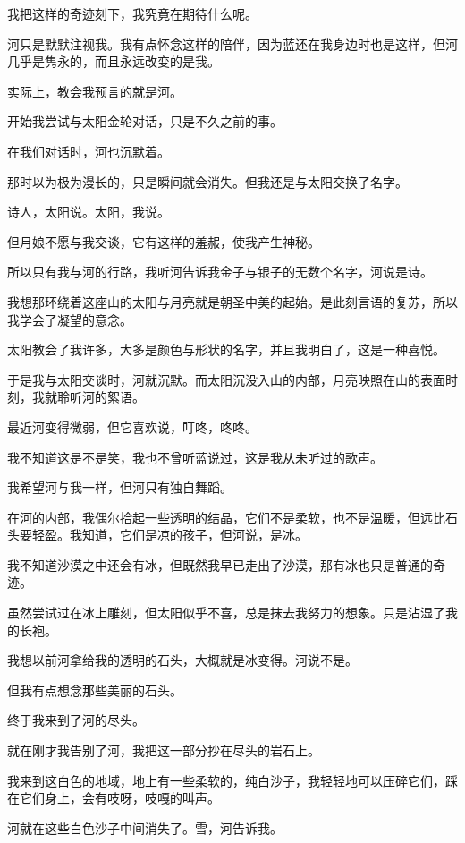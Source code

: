 \documentclass[UTF8]{article}
\begin{document}
\par 我把这样的奇迹刻下，我究竟在期待什么呢。
\par 河只是默默注视我。我有点怀念这样的陪伴，因为蓝还在我身边时也是这样，但河几乎是隽永的，而且永远改变的是我。
\par 实际上，教会我预言的就是河。
\\[0.6cm]
\par 开始我尝试与太阳金轮对话，只是不久之前的事。
\par 在我们对话时，河也沉默着。
\par 那时以为极为漫长的，只是瞬间就会消失。但我还是与太阳交换了名字。
\par 诗人，太阳说。太阳，我说。
\\[0.6cm]
\par 但月娘不愿与我交谈，它有这样的羞赧，使我产生神秘。
\par 所以只有我与河的行路，我听河告诉我金子与银子的无数个名字，河说是诗。
\par 我想那环绕着这座山的太阳与月亮就是朝圣中美的起始。是此刻言语的复苏，所以我学会了凝望的意念。
\par 太阳教会了我许多，大多是颜色与形状的名字，并且我明白了，这是一种喜悦。
\par 于是我与太阳交谈时，河就沉默。而太阳沉没入山的内部，月亮映照在山的表面时刻，我就聆听河的絮语。
\par 最近河变得微弱，但它喜欢说，叮咚，咚咚。
\par 我不知道这是不是笑，我也不曾听蓝说过，这是我从未听过的歌声。
\par 我希望河与我一样，但河只有独自舞蹈。
\par 在河的内部，我偶尔拾起一些透明的结晶，它们不是柔软，也不是温暖，但远比石头要轻盈。我知道，它们是凉的孩子，但河说，是冰。
\par 我不知道沙漠之中还会有冰，但既然我早已走出了沙漠，那有冰也只是普通的奇迹。
\par 虽然尝试过在冰上雕刻，但太阳似乎不喜，总是抹去我努力的想象。只是沾湿了我的长袍。
\par 我想以前河拿给我的透明的石头，大概就是冰变得。河说不是。
\par 但我有点想念那些美丽的石头。
\\[0.6cm]
\par 终于我来到了河的尽头。
\par 就在刚才我告别了河，我把这一部分抄在尽头的岩石上。
\par 我来到这白色的地域，地上有一些柔软的，纯白沙子，我轻轻地可以压碎它们，踩在它们身上，会有吱呀，吱嘎的叫声。
\par 河就在这些白色沙子中间消失了。雪，河告诉我。
\end{document}

